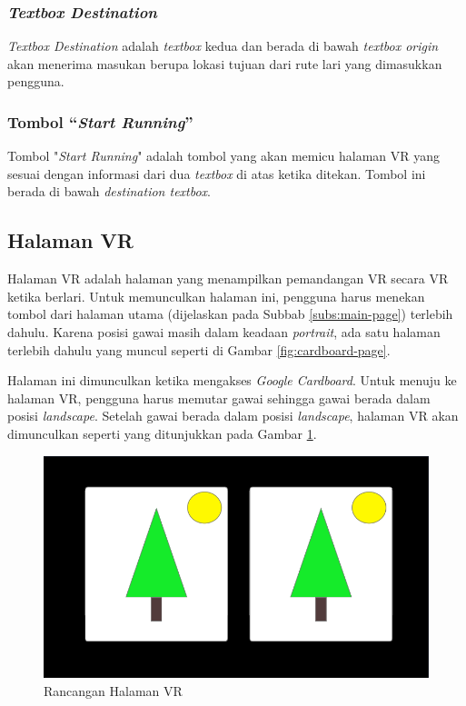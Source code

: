 \subsubsection{\textit{Textbox Destination}}
\textit{Textbox Destination} adalah \textit{textbox} kedua dan berada di bawah \textit{textbox origin}  akan menerima masukan berupa lokasi tujuan dari rute lari yang dimasukkan pengguna.   

\subsubsection{Tombol ``\textit{Start Running}''}
Tombol "\textit{Start Running}" adalah tombol yang akan memicu halaman VR yang sesuai dengan informasi dari dua \textit{textbox} di atas ketika ditekan. Tombol ini berada di bawah \textit{destination textbox}.

\subsection{Halaman VR}
Halaman VR adalah halaman yang menampilkan pemandangan VR secara VR ketika berlari. Untuk memunculkan halaman ini, pengguna harus menekan tombol dari halaman utama (dijelaskan pada Subbab \ref{subs:main-page}) terlebih dahulu. Karena posisi gawai masih dalam keadaan \textit{portrait}, ada satu halaman terlebih dahulu yang muncul seperti di Gambar \ref{fig:cardboard-page}. 

Halaman ini dimunculkan ketika mengakses \textit{Google Cardboard}. Untuk menuju ke halaman VR, pengguna harus memutar gawai sehingga gawai berada dalam posisi \textit{landscape}. Setelah gawai berada dalam posisi \textit{landscape}, halaman VR akan dimunculkan seperti yang ditunjukkan pada Gambar \ref{fig:vr-page}.

\begin{figure}[h]
	\centering
		\includegraphics[scale=0.7]{Gambar/mockup-vr-page.png}
	\caption{Rancangan Halaman VR}
	\label{fig:vr-page}
\end{figure}

